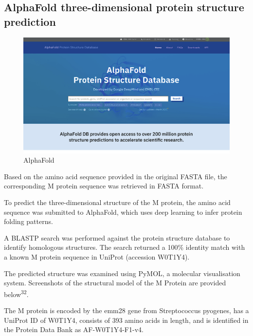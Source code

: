 \documentclass[
]{article}
\begin{document}
\newpage

\subsection{AlphaFold three-dimensional protein structure
prediction}\label{alphafold-three-dimensional-protein-structure-prediction}

\begin{figure}

{\centering \includegraphics[width=1\linewidth]{Images/Alpha} 

}

\caption{AlphaFold}\label{fig:unnamed-chunk-44}
\end{figure}

Based on the amino acid sequence provided in the original FASTA file,
the corresponding M protein sequence was retrieved in FASTA format.

To predict the three-dimensional structure of the M protein, the amino
acid sequence was submitted to AlphaFold, which uses deep learning to
infer protein folding patterns.

A BLASTP search was performed against the protein structure database to
identify homologous structures. The search returned a 100\% identity
match with a known M protein sequence in UniProt (accession W0T1Y4).

The predicted structure was examined using PyMOL, a molecular
visualisation system. Screenshots of the structural model of the M
Protein are provided below\textsuperscript{32}.

The M protein is encoded by the emm28 gene from Streptococcus pyogenes,
has a UniProt ID of W0T1Y4, consists of 393 amino acids in length, and
is identified in the Protein Data Bank as AF-W0T1Y4-F1-v4.

\newpage
\end{document}
